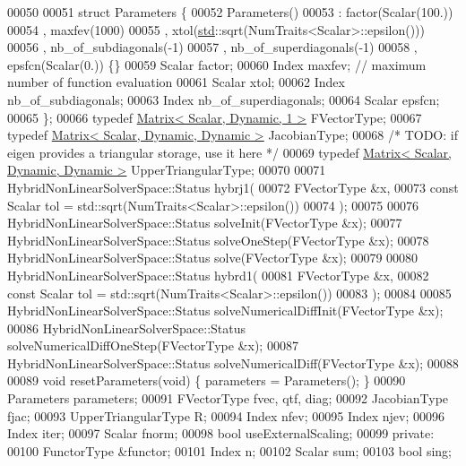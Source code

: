 \begin{DoxyCode}
00050 
00051     \textcolor{keyword}{struct }Parameters \{
00052         Parameters()
00053             : factor(Scalar(100.))
00054             , maxfev(1000)
00055             , xtol(\hyperlink{namespacestd}{std}::sqrt(NumTraits<Scalar>::epsilon()))
00056             , nb\_of\_subdiagonals(-1)
00057             , nb\_of\_superdiagonals(-1)
00058             , epsfcn(Scalar(0.)) \{\}
00059         Scalar factor;
00060         Index maxfev;   \textcolor{comment}{// maximum number of function evaluation}
00061         Scalar xtol;
00062         Index nb\_of\_subdiagonals;
00063         Index nb\_of\_superdiagonals;
00064         Scalar epsfcn;
00065     \};
00066     \textcolor{keyword}{typedef} \hyperlink{group___core___module}{Matrix< Scalar, Dynamic, 1 >} FVectorType;
00067     \textcolor{keyword}{typedef} \hyperlink{group___core___module}{Matrix< Scalar, Dynamic, Dynamic >} JacobianType;
00068     \textcolor{comment}{/* TODO: if eigen provides a triangular storage, use it here */}
00069     \textcolor{keyword}{typedef} \hyperlink{group___core___module}{Matrix< Scalar, Dynamic, Dynamic >} UpperTriangularType;
00070 
00071     HybridNonLinearSolverSpace::Status hybrj1(
00072             FVectorType  &x,
00073             \textcolor{keyword}{const} Scalar tol = std::sqrt(NumTraits<Scalar>::epsilon())
00074             );
00075 
00076     HybridNonLinearSolverSpace::Status solveInit(FVectorType  &x);
00077     HybridNonLinearSolverSpace::Status solveOneStep(FVectorType  &x);
00078     HybridNonLinearSolverSpace::Status solve(FVectorType  &x);
00079 
00080     HybridNonLinearSolverSpace::Status hybrd1(
00081             FVectorType  &x,
00082             \textcolor{keyword}{const} Scalar tol = std::sqrt(NumTraits<Scalar>::epsilon())
00083             );
00084 
00085     HybridNonLinearSolverSpace::Status solveNumericalDiffInit(FVectorType  &x);
00086     HybridNonLinearSolverSpace::Status solveNumericalDiffOneStep(FVectorType  &x);
00087     HybridNonLinearSolverSpace::Status solveNumericalDiff(FVectorType  &x);
00088 
00089     \textcolor{keywordtype}{void} resetParameters(\textcolor{keywordtype}{void}) \{ parameters = Parameters(); \}
00090     Parameters parameters;
00091     FVectorType  fvec, qtf, diag;
00092     JacobianType fjac;
00093     UpperTriangularType R;
00094     Index nfev;
00095     Index njev;
00096     Index iter;
00097     Scalar fnorm;
00098     \textcolor{keywordtype}{bool} useExternalScaling; 
00099 \textcolor{keyword}{private}:
00100     FunctorType &functor;
00101     Index n;
00102     Scalar sum;
00103     \textcolor{keywordtype}{bool} sing;

\end{DoxyCode}
